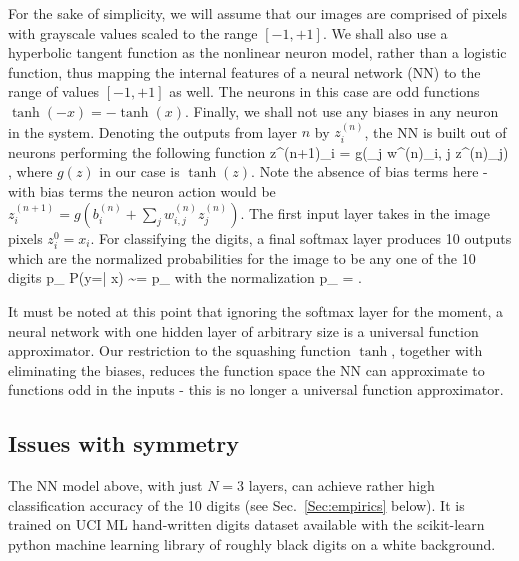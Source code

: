 \documentclass[twocolumn, nofootinbib, aps, prb]{revtex4-1}
\begin{document}
For the sake of simplicity, we will assume that our images are comprised of pixels with grayscale values scaled to the range $[-1,+1]$. We shall also use a hyperbolic tangent function as the nonlinear neuron model, rather than a logistic function, thus mapping the internal features of a neural network (NN) to the range of values $[-1, +1]$ as well. The neurons in this case are odd functions $\tanh(-x) = - \tanh(x)$. Finally, we shall not use any biases in any neuron in the system. Denoting the outputs from layer $n$ by $z^{(n)}_i$, the NN is built out of neurons performing the following function
\be
z^{(n+1)}_i = g\left(\sum_j w^{(n)}_{i, j} z^{(n)}_j\right)
\; ,
\ee
where $g(z)$ in our case is $\tanh(z)$. Note the absence of bias terms here - with bias terms the neuron action would be 
$ z^{(n+1)}_i = g\left(b^{(n)}_i + \sum_j w^{(n)}_{i, j} z^{(n)}_j\right) $. The first input layer takes in the image pixels $z^0_i = x_i$. For classifying the digits, a final softmax layer produces 10 outputs which are the normalized probabilities for the image to be any one of the 10 digits
\be\label{softmax_1}
p_{\alpha} \equiv P(y=\alpha | x) \sim \exp{} = {\tilde p}_{\alpha}
\ee
with the normalization
\be\label{softmax_2}
p_{\alpha} = 
\; .
\ee

It must be noted at this point that ignoring the softmax layer for the moment, a neural network with one hidden layer of arbitrary size is a universal function approximator\cite{hornik1989multilayer}. Our restriction to the squashing function $\tanh$, together with eliminating the biases, reduces the function space the NN can approximate to functions odd in the inputs - this is no longer a universal function approximator.

\subsection{Issues with symmetry}

The NN model above, with just $N=3$ layers, can achieve rather high classification accuracy of the 10 digits (see Sec.~\ref{Sec:empirics} below).
It is trained on UCI ML hand-written digits dataset\cite{Dua:2017} available with the scikit-learn python machine learning library\cite{scikit-learn} of roughly black digits on a white background.
\end{document}
